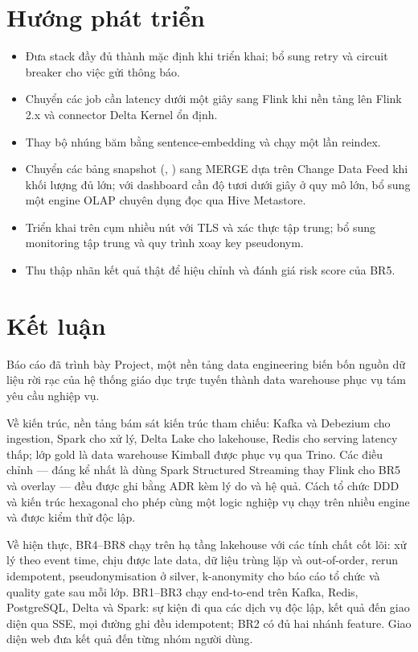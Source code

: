 \section{Hướng phát triển}

\begin{itemize}
  \item Đưa stack đầy đủ thành mặc định khi triển khai; bổ sung retry và circuit breaker cho việc gửi thông báo.
  \item Chuyển các job cần latency dưới một giây sang Flink khi nền tảng lên Flink 2.x và connector Delta Kernel ổn định.
  \item Thay bộ nhúng băm bằng sentence-embedding và chạy một lần reindex.
  \item Chuyển các bảng snapshot (, ) sang MERGE dựa trên Change Data Feed khi khối lượng đủ lớn; với dashboard cần độ tươi dưới giây ở quy mô lớn, bổ sung một engine OLAP chuyên dụng đọc qua Hive Metastore.
  \item Triển khai trên cụm nhiều nút với TLS và xác thực tập trung; bổ sung monitoring tập trung và quy trình xoay key pseudonym.
  \item Thu thập nhãn kết quả thật để hiệu chỉnh và đánh giá risk score của BR5.
\end{itemize}

\section{Kết luận}
\label{chap:conclusion}

Báo cáo đã trình bày Project, một nền tảng data engineering biến bốn nguồn dữ liệu rời rạc của hệ thống giáo dục trực tuyến thành data warehouse phục vụ tám yêu cầu nghiệp vụ.

Về kiến trúc, nền tảng bám sát kiến trúc tham chiếu: Kafka và Debezium cho ingestion, Spark cho xử lý, Delta Lake cho lakehouse, Redis cho serving latency thấp; lớp gold là data warehouse Kimball được phục vụ qua Trino. Các điều chỉnh --- đáng kể nhất là dùng Spark Structured Streaming thay Flink cho BR5 và overlay --- đều được ghi bằng ADR kèm lý do và hệ quả. Cách tổ chức DDD và kiến trúc hexagonal cho phép cùng một logic nghiệp vụ chạy trên nhiều engine và được kiểm thử độc lập.

Về hiện thực, BR4--BR8 chạy trên hạ tầng lakehouse với các tính chất cốt lõi: xử lý theo event time, chịu được late data, dữ liệu trùng lặp và out-of-order, rerun idempotent, pseudonymisation ở silver, k-anonymity cho báo cáo tổ chức và quality gate sau mỗi lớp. BR1--BR3 chạy end-to-end trên Kafka, Redis, PostgreSQL, Delta và Spark: sự kiện đi qua các dịch vụ độc lập, kết quả đến giao diện qua SSE, mọi đường ghi đều idempotent; BR2 có đủ hai nhánh feature. Giao diện web đưa kết quả đến từng nhóm người dùng.

